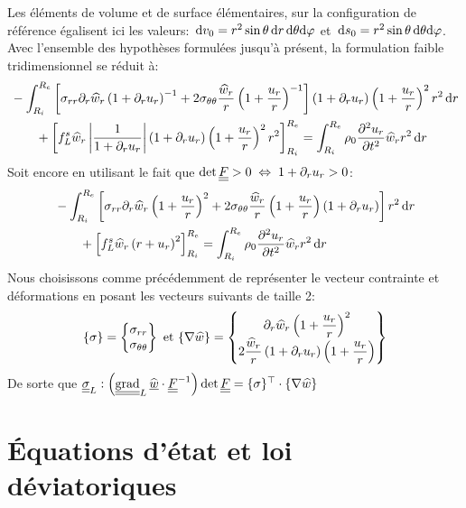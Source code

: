 \documentclass[10pt]{book}
\begin{document}
Les éléments de volume et de surface élémentaires, sur la configuration de référence égalisent ici les valeurs: $\,\mathrm{d}v_{0}=r^{2}\sin\theta\,\mathrm{d}r\,\mathrm{d}\theta\mathrm{d}\varphi$ et $\,\mathrm{d}s_{0}=r^{2}\sin\theta\,\mathrm{d}\theta\mathrm{d}\varphi$.
Avec l'ensemble des hypothèses formulées jusqu'à présent, la formulation faible tridimensionnel  se réduit à:
$$\begin{aligned}
&-\int_{R_{i}}^{R_{e}}\left[\sigma_{rr}\partial_{r}\widehat{w}_{r}\left(1+\partial_{r}u_{r}\right)^{-1}+2\sigma_{\theta\theta}\dfrac{\widehat{w}_{r}}{r}\left(1+\dfrac{u_{r}}{r}\right)^{-1}\right]\left(1+\partial_{r}u_{r}\right)\left(1+\dfrac{u_{r}}{r}\right)^{2}r^{2}\,\mathrm{d}r\\
&\qquad +\left[f^{s}_{L}\widehat{w}_{r}\left|\dfrac{1}{1+\partial_{r}u_{r}}\right|\left(1+\partial_{r}u_{r}\right)\left(1+\dfrac{u_{r}}{r}\right)^{2}r^{2}\right]_{R_{i}}^{R_{e}}=\int_{R_{i}}^{R_{e}}\rho_{0}\dfrac{\partial^{2}u_{r}}{\partial t^{2}}\widehat{w}_{r}r^{2}\,\mathrm{d}r
\end{aligned}$$
Soit encore en utilisant le fait que $\det\underline{\underline{F}}>0 \; \Leftrightarrow \; 1+\partial_{r}u_{r}>0$:
$$\begin{aligned}
&-\int_{R_{i}}^{R_{e}}\left[\sigma_{rr}\partial_{r}\widehat{w}_{r}\left(1+\dfrac{u_{r}}{r}\right)^{2}+2\sigma_{\theta\theta}\dfrac{\widehat{w}_{r}}{r}\left(1+\dfrac{u_{r}}{r}\right)\left(1+\partial_{r}u_{r}\right)\right]r^{2}\,\mathrm{d}r\\
&\qquad +\left[f^{s}_{L}\widehat{w}_{r}\left(r+u_{r}\right)^{2}\right]_{R_{i}}^{R_{e}}=\int_{R_{i}}^{R_{e}}\rho_{0}\dfrac{\partial^{2}u_{r}}{\partial t^{2}}\widehat{w}_{r}r^{2}\,\mathrm{d}r
\end{aligned}$$
Nous choisissons comme précédemment de représenter le vecteur contrainte et déformations en posant les vecteurs suivants de taille 2:
$$\{\sigma\}=\begin{Bmatrix}\sigma_{rr}\\
\sigma_{\theta\theta}\end{Bmatrix} \text{ et } \{\nabla \widehat{w}\}=\begin{Bmatrix}
\partial_{r}\widehat{w}_{r}\left(1+\dfrac{u_{r}}{r}\right)^{2}\\
2\dfrac{\widehat{w}_{r}}{r}\left(1+\partial_{r}u_{r}\right)\left(1+\dfrac{u_{r}}{r}\right)\end{Bmatrix}$$
De sorte que $\SC_{L}:\left(\tgrad_{L}\DepVirt\cdot\GT^{-1}\right)\det\GT=\{\sigma\}^{\top}\cdot\{\nabla\hat{w}\}$

\chapter{Équations d'état et loi déviatoriques}\label{Chapitre:Équations d'état loi deviatorique}
\end{document}
